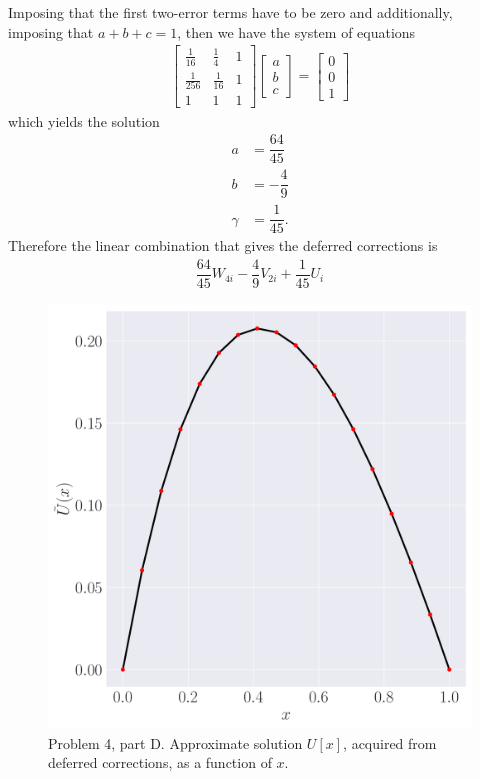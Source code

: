 \documentclass[12pt]{article}
\begin{document}
Imposing that the first two-error terms have to be zero and additionally,
imposing that $a + b + c = 1$, then we have the system of equations
\begin{align}
	\begin{bmatrix}
		\frac{1}{16} & \frac{1}{4} & 1\\
		\frac{1}{256} & \frac{1}{16} & 1\\
		1 & 1 & 1
	\end{bmatrix}
	\begin{bmatrix}
		a \\ b \\ c
	\end{bmatrix}
	=
	\begin{bmatrix}
		0 \\ 0 \\ 1
	\end{bmatrix}
\end{align}
which yields the solution
\begin{subequations}
	\begin{align}
		a &= \dfrac{64}{45}\\
		b &= -\dfrac{4}{9}\\
		\gamma &= \dfrac{1}{45}.
	\end{align}
\end{subequations}
Therefore the linear combination that gives the deferred corrections is
\begin{align}
	\dfrac{64}{45}W_{4i} - \dfrac{4}{9}V_{2i} + \dfrac{1}{45}U_{i}
\end{align}

\begin{figure}[!h]
	\centering
	\includegraphics[clip, scale=0.30]{q4d_fig.pdf}
	\caption{
		Problem 4, part D. Approximate solution $U[x]$, acquired from deferred corrections, as a function of $x$.
	}
\end{figure}
\end{document}

